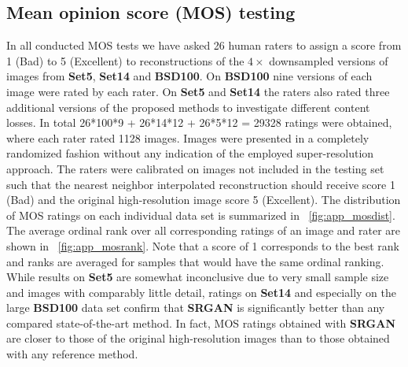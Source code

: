 \documentclass[10pt,twocolumn,letterpaper]{article}
\begin{document}
\clearpage

\subsection{Mean opinion score (MOS) testing}
\label{app:MOS}

In all conducted \ac{MOS} tests we have asked 26 human raters to assign a score from 1 (Bad) to 5 (Excellent) to reconstructions of the $4\times$ downsampled versions of images from \textbf{Set5}, \textbf{Set14} and \textbf{BSD100}. On \textbf{BSD100} nine versions of each image were rated by each rater. On \textbf{Set5} and \textbf{Set14} the raters also rated three additional versions of the proposed methods to investigate different content losses. In total 26*100*9 + 26*14*12 + 26*5*12 = 29328 ratings were obtained, where each rater rated 1128 images. Images were presented in a completely randomized fashion without any indication of the employed super-resolution approach. The raters were calibrated on images not included in the testing set such that the nearest neighbor interpolated reconstruction should receive score 1 (Bad) and the original high-resolution image score 5 (Excellent). 
The distribution of \ac{MOS} ratings on each individual data set is summarized in \figurename~\ref{fig:app_mosdist}. The average ordinal rank over all corresponding ratings of an image and rater are shown in \figurename~\ref{fig:app_mosrank}. Note that a score of 1 corresponds to the best rank and ranks are averaged for samples that would have the same ordinal ranking.
While results on \textbf{Set5} are somewhat inconclusive due to very small sample size and images with comparably little detail, ratings on \textbf{Set14} and especially on the large \textbf{BSD100} data set confirm that \textbf{SRGAN} is significantly better than any compared state-of-the-art method. In fact, \ac{MOS} ratings obtained with \textbf{SRGAN} are closer to those of the original high-resolution images than to those obtained with any reference method. 
\end{document}
